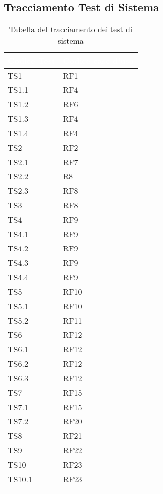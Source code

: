 \subsection{Tracciamento Test di Sistema}

{
    \setlength{\freewidth}{\dimexpr\textwidth-10\tabcolsep}
    \renewcommand{\arraystretch}{1.5}
    \centering
    \setlength{\aboverulesep}{0pt}
    \setlength{\belowrulesep}{0pt}
    \begin{longtable}{C{.25\freewidth} C{.25\freewidth}}
       \toprule
    \textcolor{white}{\textbf{Codice Test}}&
    \textcolor{white}{\textbf{Codice caso d'uso}}\\
    \toprule
    \endhead

    TS1 & RF1  \\  TS1.1 & RF4  \\   TS1.2 & RF6  \\  TS1.3 & RF4  \\
    TS1.4 & RF4  \\  TS2 & RF2  \\   TS2.1 & RF7  \\  TS2.2 & R8  \\
    TS2.3 & RF8  \\  TS3 & RF8  \\   TS4 & RF9  \\  TS4.1 & RF9  \\
    TS4.2 & RF9  \\  TS4.3 & RF9  \\   TS4.4 & RF9  \\  TS5 & RF10  \\
    TS5.1 & RF10  \\  TS5.2 & RF11  \\   TS6 & RF12  \\  TS6.1 & RF12  \\
    TS6.2 & RF12  \\  TS6.3 & RF12  \\   TS7 & RF15  \\  TS7.1 & RF15  \\
    TS7.2 & RF20  \\  TS8 & RF21  \\      TS9 & RF22  \\    TS10 & RF23  \\
    TS10.1 & RF23  \\
    
    \bottomrule
    \caption{Tabella del tracciamento dei test di sistema}
\end{longtable}
}

